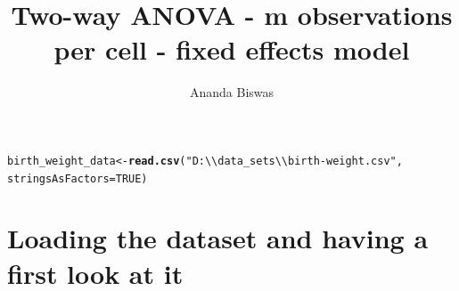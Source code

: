 \documentclass[11pt, a4paper]{article}\usepackage[]{graphicx}\usepackage[]{xcolor}
\title{Two-way ANOVA - m observations per cell - fixed effects model}
\author{Ananda Biswas}
\date{}
\makeatletter
\newcommand{\hlnum}[1]{\textcolor[rgb]{0.686,0.059,0.569}{#1}}%
\newcommand{\hlstr}[1]{\textcolor[rgb]{0.192,0.494,0.8}{#1}}%
\newcommand{\hlstd}[1]{\textcolor[rgb]{0.345,0.345,0.345}{#1}}%
\newcommand{\hlkwb}[1]{\textcolor[rgb]{0.69,0.353,0.396}{#1}}%
\newcommand{\hlkwc}[1]{\textcolor[rgb]{0.333,0.667,0.333}{#1}}%
\newcommand{\hlkwd}[1]{\textcolor[rgb]{0.737,0.353,0.396}{\textbf{#1}}}%
\newenvironment{kframe}{%
 \def\at@end@of@kframe{}%
 \ifinner\ifhmode%
  \def\at@end@of@kframe{\end{minipage}}%
  \begin{minipage}{\columnwidth}%
 \fi\fi%
 \def\FrameCommand##1{\hskip\@totalleftmargin \hskip-\fboxsep
 \colorbox{shadecolor}{##1}\hskip-\fboxsep
     \hskip-\linewidth \hskip-\@totalleftmargin \hskip\columnwidth}%
 \MakeFramed {\advance\hsize-\width
   \@totalleftmargin\z@ \linewidth\hsize
   \@setminipage}}%
 {\par\unskip\endMakeFramed%
 \at@end@of@kframe}
\newenvironment{knitrout}{}{} %
\makeatother
\begin{document}
\maketitle



\begin{knitrout}
\color{fgcolor}\begin{kframe}
\begin{alltt}
\hlstd{birth_weight_data} \hlkwb{<-} \hlkwd{read.csv}\hlstd{(}\hlstr{"D:\textbackslash{}\textbackslash{}data_sets\textbackslash{}\textbackslash{}birth-weight.csv"}\hlstd{,}
    \hlkwc{stringsAsFactors} \hlstd{=} \hlnum{TRUE}\hlstd{)}
\end{alltt}
\end{kframe}
\end{knitrout}

\section*{Loading the dataset and having a first look at it}
\end{document}
